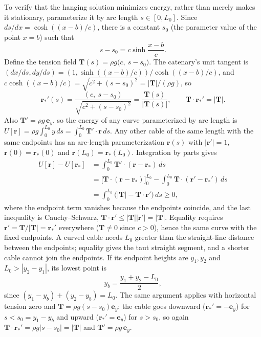 To verify that the hanging solution minimizes energy, rather than
merely makes it stationary, parameterize it by arc length
$s\in[0,L_0]$.  Since $ds/dx=\cosh((x-b)/c)$, there is a constant
$s_0$ (the parameter value of the point $x=b$) such that
\[
 s-s_0=c\sinh\frac{x-b}{c}.
\]
Define the tension field $\mathbf T(s)=\rho g\bigl(c,\ s-s_0\bigr)$.
The catenary's unit tangent is
$(dx/ds,dy/ds)=(1,\sinh((x-b)/c))/\cosh((x-b)/c)$, and
$c\cosh((x-b)/c)=\sqrt{c^2+(s-s_0)^2}=|\mathbf T|/(\rho g)$, so
\[
 \mathbf r_*'(s)=\frac{(c,\ s-s_0)}{\sqrt{c^2+(s-s_0)^2}}
 =\frac{\mathbf T(s)}{|\mathbf T(s)|},\qquad
 \mathbf T\cdot\mathbf r_*'=|\mathbf T|.
\]
Also $\mathbf T'=\rho g\,\mathbf e_y$, so the energy of any curve
parameterized by arc length is
$U[\mathbf r]=\rho g\int_0^{L_0}y\,ds=\int_0^{L_0}\mathbf T'\cdot\mathbf r\,ds$.
Any other cable of the same
length with the same endpoints has an arc-length parameterization
$\mathbf r(s)$ with $|\mathbf r'|=1$, $\mathbf r(0)=\mathbf r_*(0)$
and $\mathbf r(L_0)=\mathbf r_*(L_0)$.  Integration by parts gives
\begin{align*}
 U[\mathbf r]-U[\mathbf r_*]
 &=\int_0^{L_0}\mathbf T'\cdot(\mathbf r-\mathbf r_*)\,ds\\
 &=\bigl[\mathbf T\cdot(\mathbf r-\mathbf r_*)\bigr]_0^{L_0}
 -\int_0^{L_0}\mathbf T\cdot(\mathbf r'-\mathbf r_*')\,ds\\
 &=\int_0^{L_0}\bigl(|\mathbf T|-\mathbf T\cdot\mathbf r'\bigr)\,ds
 \ge0,
\end{align*}
where the endpoint term vanishes because the endpoints coincide, and
the last inequality is Cauchy--Schwarz,
$\mathbf T\cdot\mathbf r'\le|\mathbf T||\mathbf r'|=|\mathbf T|$.
Equality requires $\mathbf r'=\mathbf T/|\mathbf T|=\mathbf r_*'$
everywhere ($\mathbf T\ne0$ since $c>0$), hence the same curve with
the fixed endpoints.  A curved cable needs
$L_0$ greater than the straight-line distance between the endpoints;
equality gives the taut straight segment, and a shorter cable cannot
join the endpoints.
 If its endpoint heights are
$y_1,y_2$ and $L_0>|y_2-y_1|$, its lowest point is
\[
 y_b=\frac{y_1+y_2-L_0}{2},
\]
since $(y_1-y_b)+(y_2-y_b)=L_0$. The same argument applies
with horizontal tension zero and
$\mathbf T=\rho g(s-s_0)\mathbf e_y$: the cable goes downward
($\mathbf r_*'=-\mathbf e_y$) for $s<s_0=y_1-y_b$ and upward
($\mathbf r_*'=\mathbf e_y$) for $s>s_0$, so again
$\mathbf T\cdot\mathbf r_*'=\rho g|s-s_0|=|\mathbf T|$ and
$\mathbf T'=\rho g\,\mathbf e_y$.


